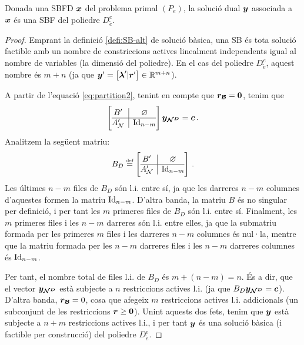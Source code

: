 \begin{prop}\label{prop:SD-SDBF}
	Donada una SBFD $\boldsymbol{x}$ del problema primal $(P_e)$, la solució dual 
	$\boldsymbol{y}$ associada a $\boldsymbol{x}$ és una SBF del poliedre $D^e_{\tilde{e}}$.
	\begin{proof}
		Emprant la definició \ref{defi:SB-alt} de solució bàsica, una SB és 
		tota solució factible amb un nombre de constriccions actives linealment 
		independents igual al nombre de variables (la dimensió del poliedre). 
		En el cas del poliedre $D^e_{\tilde{e}}$, aquest nombre és $m+n$ (ja 
		que $\boldsymbol{y}' = \left[\boldsymbol{\lambda}'\vert \boldsymbol{r}'\right]\in \mathbb{R}^{m+n}$).
		
		A partir de l'equació \eqref{eq:partition2}, tenint en compte que 
		$\boldsymbol{r_{\mathcal{B}}}=\boldsymbol{0}$, tenim que
		\[
		\left[\begin{array}{{@{}c|c@{}}}
		B'	  &	\varnothing	\\
		\hline
		A_\N' & \Id_{n-m}
		\end{array}\right]
		\vb{y_{\N^D}} = \vb{c}\,.
		\]
		Analitzem la següent matriu:
		\[
		B_D \defeq \left[
		\begin{array}{@{}c|c@{}}
		B'	  &	\varnothing	\\
		\hline
		A_\N' & \Id_{n-m}
		\end{array}
		\right]\,.
		\]
		Les últimes $n-m$ files de $B_D$ són l.i. entre sí, ja que les darreres 
		$n-m$ columnes d'aquestes formen la matriu $\operatorname{Id}_{n-m}$. D'altra banda, 
		la matriu $B$ és no singular per definició, i per tant les $m$ primeres 
		files de $B_D$ són l.i. entre sí. Finalment, les $m$ primeres files i 
		les $n-m$ darreres són l.i. entre elles, ja que la submatriu formada 
		per les primeres $m$ files i les darreres $n-m$ columnes és nul·la, 
		mentre que la matriu formada per les $n-m$ darreres files i les $n-m$ 
		darreres columnes és $\operatorname{Id}_{n-m}$.
		
		Per tant, el nombre total de files l.i. de $B_D$ és $m+(n-m) = n$. És a 
		dir, que el vector $\boldsymbol{y_{\mathcal{N}^D}}$ està subjecte a $n$ restriccions 
		actives l.i. (ja que $B_D \boldsymbol{y_{\mathcal{N}^D}} = \boldsymbol{c}$). D'altra banda, 
		$\boldsymbol{r_{\mathcal{B}}} = 0$, cosa que afegeix $m$ restriccions actives l.i. 
		addicionals (un subconjunt de les restriccions $\boldsymbol{r}\ge\boldsymbol{0}$). 
		Unint aquests dos fets, tenim que $\boldsymbol{y}$ està subjecte a $n+m$ 
		restriccions actives l.i., i per tant $\boldsymbol{y}$ és una solució bàsica (i 
		factible per construcció) del poliedre $D^e_{\tilde{e}}$.
	\end{proof}
\end{prop}

